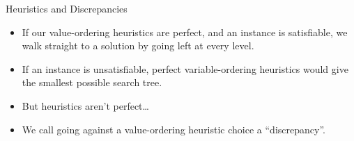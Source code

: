 \documentclass{beamer}
\begin{document}
\begin{frame}{Heuristics and Discrepancies}

    \begin{itemize}
        \item If our value-ordering heuristics are perfect, and an instance is satisfiable, we walk
            straight to a solution by going left at every level.
        \item If an instance is unsatisfiable, perfect variable-ordering heuristics would give the
            smallest possible search tree.
        \item But heuristics aren't perfect\ldots
        \item We call going against a value-ordering heuristic choice a ``discrepancy''.
    \end{itemize}

\end{frame}
\end{document}
